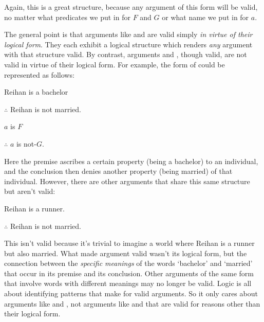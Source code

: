 \noindent Again, this is a great structure, because any argument of this form will be valid, no matter what predicates we put in for $F$ and $G$ or what name we put in for $a$.


The general point is that arguments like  and   are valid simply \emph{in virtue of their logical form}.  They each exhibit a logical structure which renders \emph{any} argument with that structure valid.  By contrast, arguments   and , though valid, are not valid in virtue of their logical form.  For example, the form of  could be represented as follows:

\begin{multicols}{2}

\begin{earg}
\item[\eref{exarg6}] Reihan is a bachelor
\item[] $\therefore$ Reihan is not married.
\end{earg}

\columnbreak

\begin{earg}
\item[] $a$ is $F$
\item[] $\therefore$ $a$ is not-$G$.
\end{earg}
\end{multicols}
\noindent Here the premise ascribes a certain property (being a bachelor) to an individual, and the conclusion then denies another property (being married) of that individual. However, there are other arguments that share this same structure but aren't valid:
\begin{earg}
\item[] Reihan is a runner.
\item[] $\therefore$ Reihan is not married.
\end{earg}
This isn't valid because it's trivial to imagine a world where Reihan is a runner but also married.  What made argument  valid wasn't its logical form, but the connection between the  \emph{specific meanings} of the words `bachelor' and `married' that occur in its premise and its conclusion. Other arguments of the same form that involve words with different meanings may no longer be valid. Logic is all about identifying patterns that make for valid arguments.  So it only cares about  arguments like  and , not arguments like  and  that are valid for reasons other than their logical form. 




